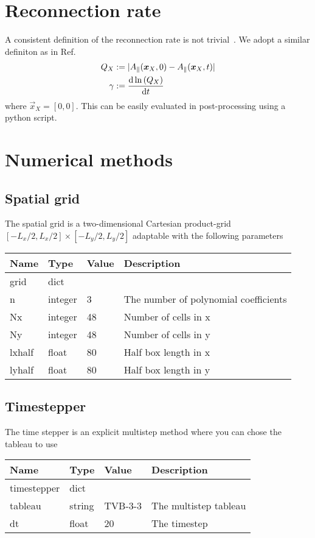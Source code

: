 \section{Reconnection rate}
 A consistent definition of the reconnection rate is not trivial~\cite{comisso16}.
 We adopt a similar definiton as in Ref.~\cite{comisso13}
\begin{align}
 Q_X&:=|  A_\parallel({\boldsymbol{x}}_X, 0)-A_\parallel({\boldsymbol{x}}_X,t) | \\
 \gamma&:= \frac{\mathrm{d} \ln{(Q_X)}}{\mathrm{d} t}
\end{align}
where $\vec{x}_X = [0,0]$.
This can be easily evaluated in post-processing using a python script.

\section{Numerical methods}

\subsection{Spatial grid}
The spatial grid is a two-dimensional Cartesian product-grid $[-L_x/2, L_x/2]\times [-L_y/2, L_y/2]$ adaptable with the following parameters
\begin{longtable}{llll}
\toprule
\rowcolor{gray!50}\textbf{Name} &  \textbf{Type} & \textbf{Value}  & \textbf{Description}  \\ \midrule
grid & dict & & \\
\qquad n  & integer & 3  & The number of polynomial coefficients \\
\qquad Nx & integer & 48 & Number of cells in x \\
\qquad Ny & integer & 48 & Number of cells in y \\
\qquad lxhalf & float& 80 & Half box length in x \\
\qquad lyhalf & float& 80 & Half box length in y \\
\bottomrule
\end{longtable}
\subsection{Timestepper}
The time stepper is an explicit multistep method where you can chose the
tableau to use
\begin{longtable}{llll}
\toprule
\rowcolor{gray!50}\textbf{Name} &  \textbf{Type} & \textbf{Value}  & \textbf{Description}  \\ \midrule
timestepper & dict & & \\
\qquad tableau  & string & TVB-3-3  & The multistep tableau \\
\qquad dt & float & 20 & The timestep \\
\bottomrule
\end{longtable}
